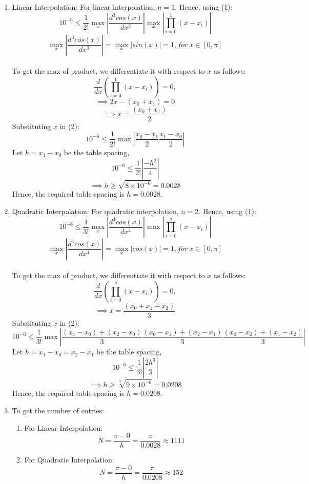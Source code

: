 \documentclass[10pt,letterpaper]{article}
\theoremstyle{definition}
\theoremstyle{remark}
\begin{document}
\begin{enumerate}[leftmargin=*,itemsep=9ex]
  \begin{enumerate}
    \item Linear Interpolation:
    For linear interpolation, $n=1$. Hence, using (1):
    \begin{equation}
      10^{-6} \leq \frac{1}{2!}\max_x{|\frac{d^3cos(x)}{dx^3}|}\max_x|\prod_{i=0}^{1} (x - x_i)|
    \end{equation}
    \[
      \max_x{|\frac{d^3cos(x)}{dx^3}|} = \max_x{|sin(x)|} = 1, for \ x \in [0, \pi]
    \]
    \\
    To get the max of product, we differentiate it with respect to $x$ as follows:
    \[
      \frac{d}{dx}(\prod_{i=0}^{1} (x - x_i)) = 0,
    \]
    \[
      \implies 2x - (x_0 + x_1) = 0
    \]
    \[
      \implies x = \frac{(x_0 + x_1)}{2}
    \]
    Substituting $x$ in (2):
    \[
      10^{-6} \leq \frac{1}{2!}\max|\frac{x_0 - x_1}{2}\frac{x_1 - x_0}{2}|
    \]
    Let $h = x_1 - x_0$ be the table spacing,
    \[
      10^{-6} \leq \frac{1}{2!}|\frac{-h^2}{4}|
    \]
    \[
      \implies h \geq \sqrt{8\times10^{-6}} = 0.0028
    \]
    Hence, the required table spacing is $h = 0.0028$.
    \\
    \item Quadratic Interpolation:
    For quadratic interpolation, $n=2$. Hence, using (1):
    \begin{equation}
      10^{-6} \leq \frac{1}{3!}\max_x{|\frac{d^4cos(x)}{dx^4}|}\max|\prod_{i=0}^{2} (x - x_i)|
    \end{equation}
    \[
      \max_x{|\frac{d^4cos(x)}{dx^4}|} = \max_x{|cos(x)|} = 1, for \ x \in [0, \pi]
    \]
    \\    
    To get the max of product, we differentiate it with respect to $x$ as follows:
    \[
      \frac{d}{dx}(\prod_{i=0}^{2} (x - x_i)) = 0,
    \]
    \[
      \implies x = \frac{(x_0 + x_1 + x_2)}{3}
    \]
    Substituting $x$ in (2):
    \[
      10^{-6} \leq \frac{1}{3!}\max|\frac{(x_1 - x_0) + (x_2 - x_0)}{3}\frac{(x_0 - x_1) + (x_2 - x_1)}{3}\frac{(x_0 - x_2) + (x_1 - x_2)}{3}|
    \]
    Let $h = x_1 - x_0 = x_2 - x_1$ be the table spacing,
    \[
      10^{-6} \leq \frac{1}{3!}|\frac{2h^3}{3}|
    \]
    \[
      \implies h \geq \sqrt[3]{9\times10^{-6}} = 0.0208
    \]
    Hence, the required table spacing is $h = 0.0208$.
    
    \item To get the number of entries:
    \begin{enumerate}
      \item For Linear Interpolation:
      \[
        N = \frac{\pi - 0}{h} = \frac{\pi}{0.0028} \approx 1111
      \]
      \item For Quadratic Interpolation:
      \[
        N = \frac{\pi - 0}{h} = \frac{\pi}{0.0208} \approx 152
      \]      
    \end{enumerate}
  \end{enumerate}
\end{enumerate}
\end{document}
